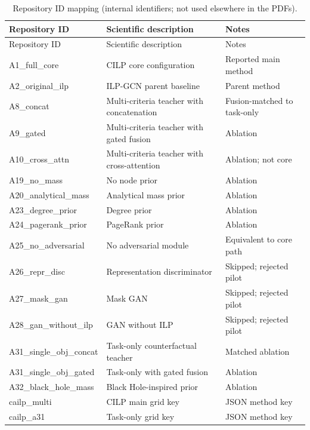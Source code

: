 \begin{center}\scriptsize
\begin{longtable}{@{}llp{7.2cm}@{}}
\caption{Repository ID mapping (internal identifiers; not used elsewhere in the PDFs).}\\
\toprule
Repository ID & Scientific description & Notes \\
\midrule
\endfirsthead
\toprule
Repository ID & Scientific description & Notes \\
\midrule
\endhead
A1\_full\_core & CILP core configuration & Reported main method \\
A2\_original\_ilp & ILP-GCN parent baseline & Parent method \\
A8\_concat & Multi-criteria teacher with concatenation & Fusion-matched to task-only \\
A9\_gated & Multi-criteria teacher with gated fusion & Ablation \\
A10\_cross\_attn & Multi-criteria teacher with cross-attention & Ablation; not core \\
A19\_no\_mass & No node prior & Ablation \\
A20\_analytical\_mass & Analytical mass prior & Ablation \\
A23\_degree\_prior & Degree prior & Ablation \\
A24\_pagerank\_prior & PageRank prior & Ablation \\
A25\_no\_adversarial & No adversarial module & Equivalent to core path \\
A26\_repr\_disc & Representation discriminator & Skipped; rejected pilot \\
A27\_mask\_gan & Mask GAN & Skipped; rejected pilot \\
A28\_gan\_without\_ilp & GAN without ILP & Skipped; rejected pilot \\
A31\_single\_obj\_concat & Task-only counterfactual teacher & Matched ablation \\
A31\_single\_obj\_gated & Task-only with gated fusion & Ablation \\
A32\_black\_hole\_mass & Black Hole-inspired prior & Ablation \\
cailp\_multi & CILP main grid key & JSON method key \\
cailp\_a31 & Task-only grid key & JSON method key \\
\bottomrule
\end{longtable}
\end{center}
